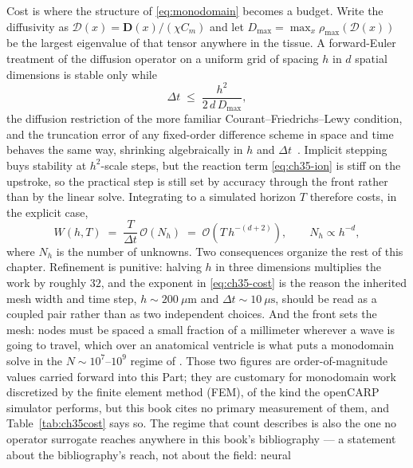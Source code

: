 Cost is where the structure of \eqref{eq:monodomain} becomes a budget. Write the
diffusivity as $\mathcal{D}(x)=\mathbf{D}(x)/(\chi C_m)$ and let
$D_{\max}=\max_x \rho_{\max}(\mathcal{D}(x))$ be the largest eigenvalue of that
tensor anywhere in the tissue. A forward-Euler treatment of the diffusion
operator on a uniform grid of spacing $h$ in $d$ spatial dimensions is stable
only while
\begin{equation}
  \label{eq:ch35-cfl}
  \Delta t \;\le\; \frac{h^{2}}{2\,d\,D_{\max}},
\end{equation}
the diffusion restriction of the more familiar Courant--Friedrichs--Lewy
condition, and the truncation error of any fixed-order difference scheme in
space and time behaves the same way, shrinking algebraically in $h$ and $\Delta
t$~\cite{quarteroni2008numerical}. Implicit stepping buys
stability at $h^2$-scale steps, but the reaction term \eqref{eq:ch35-ion} is
stiff on the upstroke, so the practical step is still set by accuracy through
the front rather than by the linear solve. Integrating to a simulated horizon
$T$ therefore costs, in the explicit case,
\begin{equation}
  \label{eq:ch35-cost}
  W(h,T) \;=\; \frac{T}{\Delta t}\,\mathcal{O}(N_h)
  \;=\; \mathcal{O}\!\left(T\,h^{-(d+2)}\right),
  \qquad N_h \propto h^{-d},
\end{equation}
where $N_h$ is the number of unknowns. Two consequences organize the rest of
this chapter. Refinement is punitive: halving $h$ in three dimensions multiplies
the work by roughly $32$, and the exponent in \eqref{eq:ch35-cost} is the reason
the inherited mesh width and time step, $h\sim 200\ \mu\text{m}$ and
$\Delta t\sim 10\ \mu\text{s}$, should be read as a coupled pair rather than as
two independent choices. And the front sets the mesh: nodes must be spaced a
small fraction of a millimeter wherever a wave is going to travel, which over an
anatomical ventricle is what puts a monodomain solve in the
$N\sim10^{7}$--$10^{9}$ regime of
. Those two figures
are order-of-magnitude values carried forward into this Part; they are customary
for monodomain work discretized by the finite element method (FEM), of the kind
the openCARP simulator performs, but this book cites no primary measurement of
them, and Table~\ref{tab:ch35cost} says so. The regime that count describes is
also the one no operator surrogate reaches anywhere in this book's bibliography
--- a statement about the bibliography's reach, not about the field: neural

